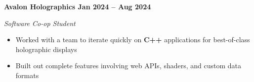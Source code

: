 \textbf{Avalon Holographics \hfill Jan 2024 -- Aug 2024}\par

\textit{Software Co-op Student}
\begin{itemize}
	\item Worked with a team to iterate quickly on \textbf{C++} applications for best-of-class holographic displays
    \item Built out complete features involving web APIs, shaders, and custom data formats
\end{itemize}\par
